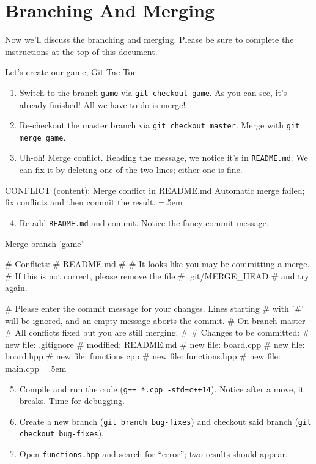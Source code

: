 \documentclass[12pt]{article}
\newenvironment{lcverbatim}
 {\SaveVerbatim{cverb}}
 {\endSaveVerbatim
  \flushleft\fboxrule=0pt\fboxsep=.5em
  \scriptsize
  \colorbox{cverbbg}{%
    \makebox[\dimexpr\linewidth-2\fboxsep][l]{\BUseVerbatim{cverb}}%
  }
  \endflushleft
}
\newcommand{\shellcmd}[1]{\texttt{\colorbox{gray!30}{#1}}}
\begin{document}
\section{Branching And Merging}
Now we'll discuss the branching and merging. Please be sure to complete the instructions at the top of this document.

Let's create our game, Git-Tac-Toe.

\begin{enumerate}
    \item Switch to the branch \texttt{game} via \shellcmd{git checkout game}. As you can see, it's already finished! All we have to do is merge!
    \item Re-checkout the master branch via \shellcmd{git checkout master}. Merge with \shellcmd{git merge game}.
    \item Uh-oh! Merge conflict. Reading the message, we notice it's in \texttt{README.md}. We can fix it by deleting one of the two lines; either one is fine.
\end{enumerate}

\begin{lcverbatim}
CONFLICT (content): Merge conflict in README.md
Automatic merge failed; fix conflicts and then commit the result.
\end{lcverbatim}

\begin{enumerate}
    \setcounter{enumi}{3}
    \item Re-add \texttt{README.md} and commit. Notice the fancy commit message.
\end{enumerate}

\begin{lcverbatim}
Merge branch 'game'

# Conflicts:
#       README.md
#
# It looks like you may be committing a merge.
# If this is not correct, please remove the file
#       .git/MERGE_HEAD
# and try again.


# Please enter the commit message for your changes. Lines starting
# with '#' will be ignored, and an empty message aborts the commit.
# On branch master
# All conflicts fixed but you are still merging.
#
# Changes to be committed:
#       new file:   .gitignore
#       modified:   README.md
#       new file:   board.cpp
#       new file:   board.hpp
#       new file:   functions.cpp
#       new file:   functions.hpp
#       new file:   main.cpp
\end{lcverbatim}

\begin{enumerate}
    \setcounter{enumi}{4}
    \item Compile and run the code (\shellcmd{g++ *.cpp -std=c++14}). Notice after a move, it breaks. Time for debugging.
    \item Create a new branch (\shellcmd{git branch bug-fixes}) and checkout said branch (\shellcmd{git checkout bug-fixes}).
    \item Open \texttt{functions.hpp} and search for ``error''; two results should appear.
\end{enumerate}
\end{document}

